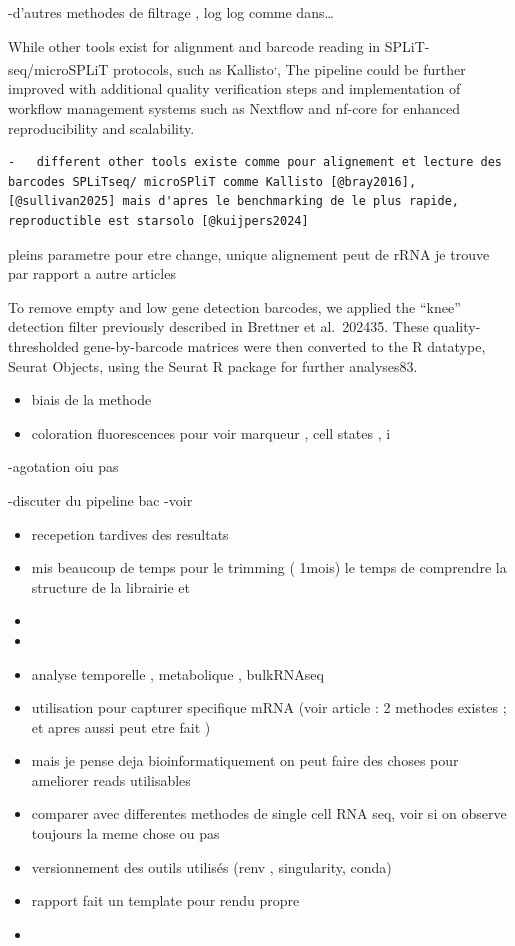 \documentclass[
  11pt,
  a4paper,
]{report}
\providecommand{\tightlist}{%
  \setlength{\itemsep}{0pt}\setlength{\parskip}{0pt}}\usepackage{longtable,booktabs,array}
\begin{document}
-d'autres methodes de filtrage , log log comme dans\ldots{}

While other tools exist for alignment and barcode reading in
SPLiT-seq/microSPLiT protocols, such as
Kallisto\textsuperscript{,},
The pipeline could be further improved with additional quality
verification steps and implementation of workflow management systems
such as Nextflow and nf-core for enhanced reproducibility and
scalability.

\begin{verbatim}
-   different other tools existe comme pour alignement et lecture des barcodes SPLiTseq/ microSPliT comme Kallisto [@bray2016], [@sullivan2025] mais d'apres le benchmarking de le plus rapide, reproductible est starsolo [@kuijpers2024]
\end{verbatim}

pleins parametre pour etre change, unique alignement peut de rRNA je
trouve par rapport a autre articles

To remove empty and low gene detection barcodes, we applied the ``knee''
detection filter previously described in Brettner et al.~202435. These
quality-thresholded gene-by-barcode matrices were then converted to the
R datatype, Seurat Objects, using the Seurat R package for further
analyses83.

\begin{itemize}
\tightlist
\item
  biais de la methode
\item
  coloration fluorescences pour voir marqueur , cell states , i
\end{itemize}

-agotation oiu pas

-discuter du pipeline bac -voir

\begin{itemize}
\item
  recepetion tardives des resultats
\item
  mis beaucoup de temps pour le trimming ( 1mois) le temps de comprendre
  la structure de la librairie et
\item
\item
\item
  analyse temporelle , metabolique , bulkRNAseq
\item
  utilisation pour capturer specifique mRNA (voir article : 2 methodes
  existes ; et apres aussi peut etre fait )
\item
  mais je pense deja bioinformatiquement on peut faire des choses pour
  ameliorer reads utilisables
\item
  comparer avec differentes methodes de single cell RNA seq, voir si on
  observe toujours la meme chose ou pas
\item
  versionnement des outils utilisés (renv , singularity, conda)
\item
  rapport fait un template pour rendu propre
\item
\end{itemize}
\end{document}
